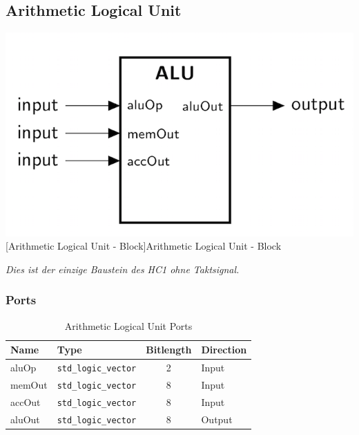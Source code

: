
\pagebreak
\subsection{Arithmetic Logical Unit}

\vspace{1em}
\begin{minipage}{\linewidth}
    \centering
    \includegraphics[width=0.4\linewidth]{images/ALU.png}
    [Arithmetic Logical Unit - Block]{Arithmetic Logical Unit - Block}
    \label{fig:alu_block}
\end{minipage}

\emph{Dies ist der einzige Baustein des HC1 ohne Taktsignal.}

\subsubsection{Ports}

\vspace{1em}
\begin{table}[!h]
	\centering
	\begin{tabular}{|l|l|c|l|}
		\hline
		\textbf{Name} & \textbf{Type} & \textbf{Bitlength} & \textbf{Direction}\\
		\hline
		aluOp & \texttt{std\_logic\_vector} & 2 & Input \\
		\hline
		memOut & \texttt{std\_logic\_vector} & 8 & Input \\
		\hline
		accOut & \texttt{std\_logic\_vector} & 8 & Input \\
		\hline
		aluOut & \texttt{std\_logic\_vector} & 8 & Output \\
		\hline
	\end{tabular}
	\caption{Arithmetic Logical Unit Ports}
	\label{tab:alu_ports}
\end{table}



